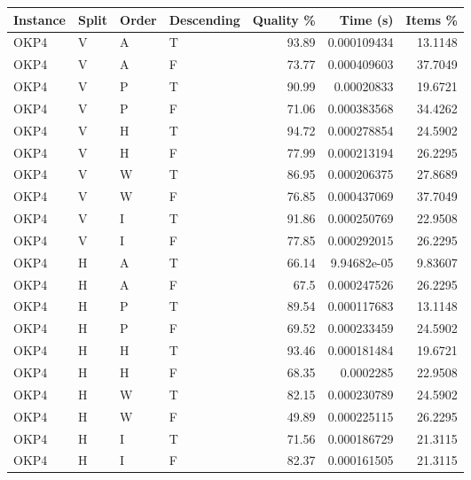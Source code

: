 \begin{tabular}{llllrrr}
    \hline
    Instance & Split & Order & Descending & Quality \% & Time (s)    & Items \% \\
    \hline
    OKP4     & V     & A     & T          & 93.89      & 0.000109434 & 13.1148  \\
    OKP4     & V     & A     & F          & 73.77      & 0.000409603 & 37.7049  \\
    OKP4     & V     & P     & T          & 90.99      & 0.00020833  & 19.6721  \\
    OKP4     & V     & P     & F          & 71.06      & 0.000383568 & 34.4262  \\
    OKP4     & V     & H     & T          & 94.72      & 0.000278854 & 24.5902  \\
    OKP4     & V     & H     & F          & 77.99      & 0.000213194 & 26.2295  \\
    OKP4     & V     & W     & T          & 86.95      & 0.000206375 & 27.8689  \\
    OKP4     & V     & W     & F          & 76.85      & 0.000437069 & 37.7049  \\
    OKP4     & V     & I     & T          & 91.86      & 0.000250769 & 22.9508  \\
    OKP4     & V     & I     & F          & 77.85      & 0.000292015 & 26.2295  \\
    OKP4     & H     & A     & T          & 66.14      & 9.94682e-05 & 9.83607  \\
    OKP4     & H     & A     & F          & 67.5       & 0.000247526 & 26.2295  \\
    OKP4     & H     & P     & T          & 89.54      & 0.000117683 & 13.1148  \\
    OKP4     & H     & P     & F          & 69.52      & 0.000233459 & 24.5902  \\
    OKP4     & H     & H     & T          & 93.46      & 0.000181484 & 19.6721  \\
    OKP4     & H     & H     & F          & 68.35      & 0.0002285   & 22.9508  \\
    OKP4     & H     & W     & T          & 82.15      & 0.000230789 & 24.5902  \\
    OKP4     & H     & W     & F          & 49.89      & 0.000225115 & 26.2295  \\
    OKP4     & H     & I     & T          & 71.56      & 0.000186729 & 21.3115  \\
    OKP4     & H     & I     & F          & 82.37      & 0.000161505 & 21.3115  \\

\end{tabular}
